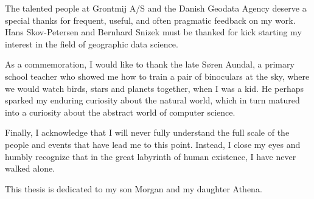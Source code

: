 \documentclass[11pt, oneside]{report}
\begin{document}
The talented people at Grontmij A/S and the Danish Geodata Agency deserve a special thanks for frequent, useful, and often pragmatic feedback on my work. Hans Skov-Petersen and Bernhard Snizek must be thanked for kick starting my interest in the field of geographic data science.

As a commemoration, I would like to thank the late S{\o}ren Aundal, a primary school teacher who showed me how to train a pair of binoculars at the sky, where we would watch birds, stars and planets together, when I was a kid. He perhaps sparked my enduring curiosity about the natural world, which in turn matured into a curiosity about the abstract world of computer science.

Finally, I acknowledge that I will never fully understand the full scale of the people and events that have lead me to this point. Instead, I close my eyes and humbly recognize that in the great labyrinth of human existence, I have never walked alone.

This thesis is dedicated to my son Morgan and my daughter Athena.

\tableofcontents
\end{document}
